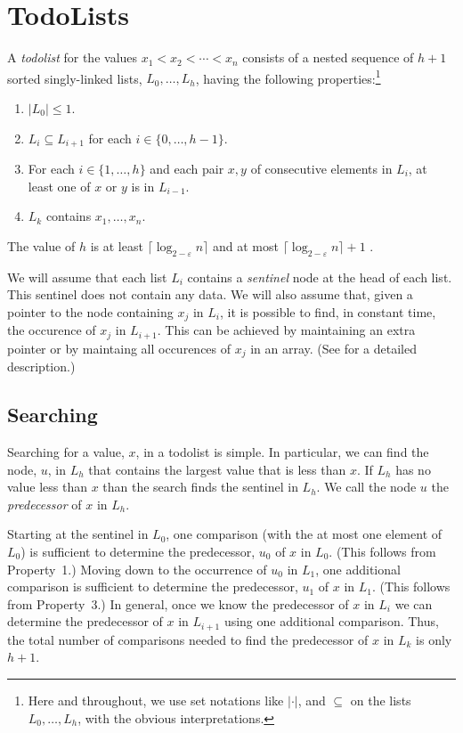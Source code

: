 \documentclass[12pt]{patmorin}
\begin{document}
\section{TodoLists}

A \emph{todolist} for the values $x_1<x_2<\cdots<x_n$ consists of a
nested sequence of $h+1$ sorted singly-linked lists, $L_0,\ldots,L_h$,
having the following properties:\footnote{Here and throughout, we use set
notations like $|\cdot|$, and $\subseteq$ on the lists $L_0,\ldots,L_h$,
with the obvious interpretations.}

\begin{enumerate}
\item $|L_0| \le 1$.
\item $L_i\subseteq L_{i+1}$ for each $i\in\{0,\ldots,h-1\}$.
\item For each $i\in\{1,\ldots,h\}$ and each pair $x,y$ of consecutive elements in $L_i$, at least one of $x$ or $y$ is in $L_{i-1}$.
\item $L_k$ contains $x_1,\ldots,x_n$.
\end{enumerate}

The value of $h$ is at least $\lceil \log_{2-\varepsilon} n\rceil$ and at most
$\lceil \log_{2-\varepsilon} n\rceil+1$ .

We will assume that each list $L_i$ contains a \emph{sentinel} node
at the head of each list. This sentinel does not contain any data.
We will also assume that, given a pointer to the node containing $x_j$
in $L_i$, it is possible to find, in constant time, the occurence of $x_j$
in $L_{i+1}$.  This can be achieved by maintaining an extra pointer or by
maintaing all occurences of $x_j$ in an array. (See 
for a detailed description.)

\subsection{Searching}

Searching for a value, $x$, in a todolist is simple. In particular, we
can find the node, $u$, in $L_h$ that contains the largest value that
is less than $x$. If $L_h$ has no value less than $x$ than the search
finds the sentinel in $L_h$.  We call the node $u$ the \emph{predecessor}
of $x$ in $L_h$.

Starting at the sentinel in $L_0$, one comparison (with the at most one
element of $L_0$) is sufficient to determine the predecessor, $u_0$ of $x$
in $L_0$. (This follows from Property~1.)  Moving down to the occurrence
of $u_0$ in $L_1$, one additional comparison is sufficient to determine
the predecessor, $u_1$ of $x$ in $L_1$. (This follows from Property~3.)
In general, once we know the predecessor of $x$ in $L_i$ we can determine
the predecessor of $x$ in $L_{i+1}$ using one additional comparison. Thus,
the total number of comparisons needed to find the predecessor of $x$
in $L_k$ is only $h+1$.
\end{document}
